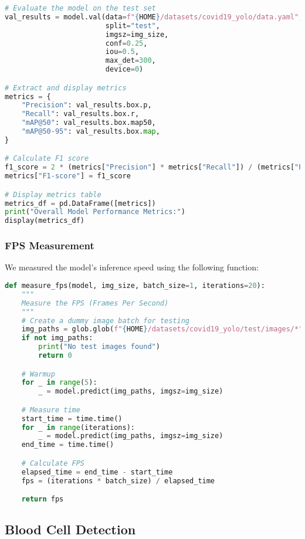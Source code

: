 \begin{lstlisting}[language=Python, caption={COVID-19 X-ray Model Evaluation}, label={lst:covid-eval}]
# Evaluate the model on the test set
val_results = model.val(data=f"{HOME}/datasets/covid19_yolo/data.yaml",
                        split="test",
                        imgsz=img_size,
                        conf=0.25,
                        iou=0.5,
                        max_det=300,
                        device=0)

# Extract and display metrics
metrics = {
    "Precision": val_results.box.p,
    "Recall": val_results.box.r,
    "mAP@50": val_results.box.map50,
    "mAP@50-95": val_results.box.map,
}

# Calculate F1 score
f1_score = 2 * (metrics["Precision"] * metrics["Recall"]) / (metrics["Precision"] + metrics["Recall"])
metrics["F1-score"] = f1_score

# Display metrics table
metrics_df = pd.DataFrame([metrics])
print("Overall Model Performance Metrics:")
display(metrics_df)
\end{lstlisting}

\subsubsection{FPS Measurement}
We measured the model's inference speed using the following function:

\begin{lstlisting}[language=Python, caption={FPS Measurement for COVID-19 X-ray Detection}, label={lst:covid-fps}]
def measure_fps(model, img_size, batch_size=1, iterations=20):
    """
    Measure the FPS (Frames Per Second)
    """
    # Create a dummy image batch for testing
    img_paths = glob.glob(f"{HOME}/datasets/covid19_yolo/test/images/*")[:batch_size]
    if not img_paths:
        print("No test images found")
        return 0

    # Warmup
    for _ in range(5):
        _ = model.predict(img_paths, imgsz=img_size)

    # Measure time
    start_time = time.time()
    for _ in range(iterations):
        _ = model.predict(img_paths, imgsz=img_size)
    end_time = time.time()

    # Calculate FPS
    elapsed_time = end_time - start_time
    fps = (iterations * batch_size) / elapsed_time

    return fps
\end{lstlisting}

\subsection{Blood Cell Detection}
\label{appendix:blood-cell-code}

